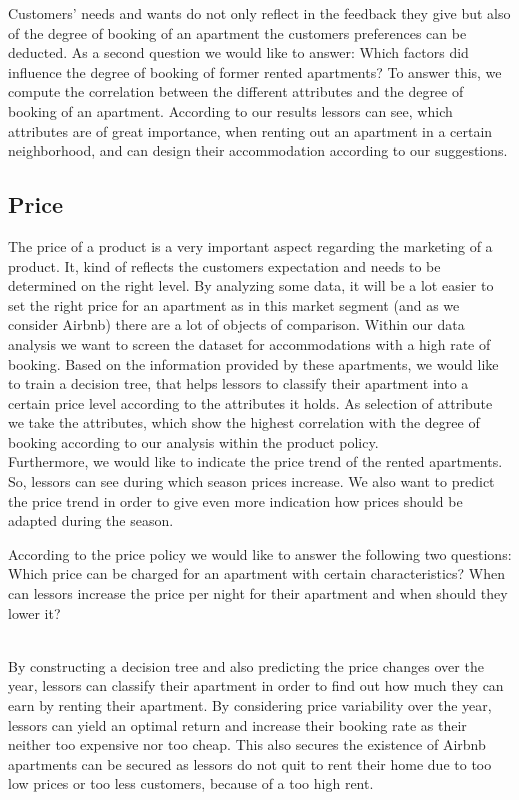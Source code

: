 \documentclass[journal]{IEEEtran}
\begin{document}
Customers’ needs and wants do not only reflect in the feedback they give but also of the degree of booking of an apartment the customers preferences can be deducted. As a second question we would like to answer: Which factors did influence the degree of booking of former rented apartments? To answer this, we compute the correlation between the different attributes and the degree of booking of an apartment. According to our results lessors can see, which attributes are of great importance, when renting out an apartment in a certain neighborhood, and can design their accommodation according to our suggestions. 

\subsection{Price}
\noindent The price of a product is a very important aspect regarding the marketing of a product. It, kind of reflects the customers expectation and needs to be determined on the right level. By analyzing some data, it will be a lot easier to set the right price for an apartment as in this market segment (and as we consider Airbnb) there are a lot of objects of comparison. Within our data analysis we want to screen the dataset for accommodations with a high rate of booking. Based on the information provided by these apartments, we would like to train a decision tree, that helps lessors to classify their apartment into a certain price level according to the attributes it holds. As selection of attribute we take the attributes, which show the highest correlation with the degree of booking according to our analysis within the product policy.\\ Furthermore, we would like to indicate the price trend of the rented apartments. So, lessors can see during which season prices increase. We also want to predict the price trend in order to give even more indication how prices should be adapted during the season.\\
\begin{itshape}
According to the price policy we would like to answer the following two questions: Which price can be charged for an apartment with certain characteristics? When can lessors increase the price per night for their apartment and when should they lower it?
\end{itshape}
\\By constructing a decision tree and also predicting the price changes over the year, lessors can classify their apartment in order to find out how much they can earn by renting their apartment. By considering price variability over the year, lessors can yield an optimal return and increase their booking rate as their neither too expensive nor too cheap. This also secures the existence of Airbnb apartments can be secured as lessors do not quit to rent their home due to too low prices or too less customers, because of a too high rent.
\end{document}
